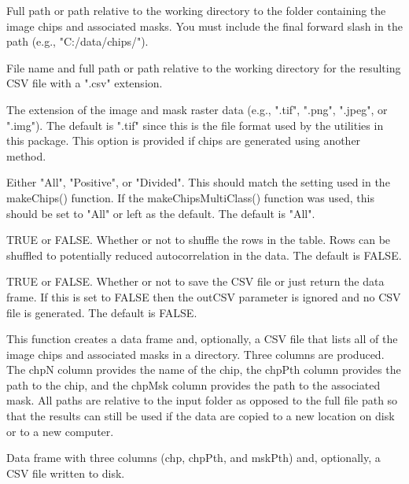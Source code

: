 \documentclass[a4paper]{book}
\begin{document}
%
\begin{Arguments}
\begin{ldescription}
\item[\code{folder}] Full path or path relative to the working directory to the
folder containing the image chips and associated masks. You must include the
final forward slash in the path (e.g., "C:/data/chips/").

\item[\code{outCSV}] File name and full path or path relative to the working directory
for the resulting CSV file with a ".csv" extension.

\item[\code{extension}] The extension of the image and mask raster data (e.g., ".tif",
".png", ".jpeg", or ".img"). The default is ".tif" since this is the file
format used by the utilities in this package. This option is provided if chips
are generated using another method.

\item[\code{mode}] Either "All", "Positive", or "Divided". This should match the setting
used in the makeChips() function. If the makeChipsMultiClass() function was used,
this should be set to "All" or left as the default. The default is "All".

\item[\code{shuffle}] TRUE or FALSE. Whether or not to shuffle the rows in the table.
Rows can be shuffled to potentially reduced autocorrelation in the data. The
default is FALSE.

\item[\code{saveCSV}] TRUE or FALSE. Whether or not to save the CSV file or just
return the data frame. If this is set to FALSE then the outCSV parameter is
ignored and no CSV file is generated. The default is FALSE.
\end{ldescription}
\end{Arguments}
%
\begin{Details}\relax
This function creates a data frame and, optionally, a CSV file that lists all
of the image chips and associated masks in a directory. Three columns are
produced. The chpN column provides the name of the chip, the chpPth column
provides the path to the chip, and the chpMsk column provides the path to the
associated mask. All paths are relative to the input folder as opposed to
the full file path so that the results can still be used if the data are copied
to a new location on disk or to a new computer.
\end{Details}
%
\begin{Value}
Data frame with three columns (chp, chpPth, and mskPth) and, optionally,
a CSV file written to disk.
\end{Value}
\end{document}
